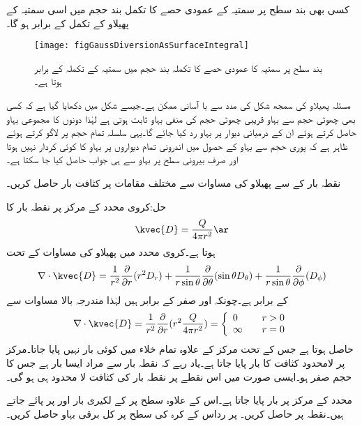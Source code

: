 کسی بھی بند سطح پر  سمتیہ کے عمودی حصے کا تکمل بند حجم میں اسی سمتیہ کے پھیلاو کے تکمل کے برابر ہو گا۔
\begin{figure}
\centering
\texttt{[image: figGaussDiversionAsSurfaceIntegral]}
\caption{بند سطح پر سمتیہ کا عمودی حصے کا تکملہ بند حجم میں سمتیہ کے تکملہ کے برابر ہوتا ہے۔}
\label{شکل_گاوس_پھیلاو_بطور_سطحی_تکلم}
\end{figure}

مسئلہ پھیلاو کی سمجھ شکل  کی مدد سے با آسانی ممکن ہے۔جیسے شکل میں دکھایا گیا ہے کہ کسی بھی چھوٹی حجم سے بہاو قریبی چھوٹی حجم  کی منفی بہاو ثابت ہوتی ہے لہٰذا دونوں کا مجموعی بہاو  حاصل کرتے ہوئے ان کے درمیانی دیوار  پر بہاو رد کیا جائے گا۔یہی سلسلہ تمام حجم پر لاگو کرتے ہوئے ظاہر ہے کہ پوری حجم سے بہاو کے حصول میں اندرونی تمام دیواروں پر بہاو کا کوئی کردار نہیں ہوتا اور صرف بیرونی سطح پر بہاو سے ہی جواب حاصل کیا جا سکتا ہے۔

نقطہ بار کے  سے پھیلاو کی مساوات سے مختلف مقامات پر کثافت بار  حاصل کریں۔

حل:کروی محدد کے مرکز پر نقطہ بار کا
\begin{align*}
\kvec{D}=\frac{Q}{4\pi r^2} \ar
\end{align*}
ہوتا ہے۔کروی محدد میں پھیلاو کی مساوات کے تحت
\begin{align*}
\nabla \cdot \kvec{D}=\frac{1}{r^2 }\frac{\partial }{\partial r} (r^2   D_{r})+\frac{1}{r \sin \theta }\frac{\partial }{\partial \theta} (\sin \theta  D_{\theta})+\frac{1}{r \sin \theta }\frac{\partial }{\partial \phi} (  D_{\phi}) 
\end{align*}
کے برابر ہے۔چونکہ  اور  صفر کے برابر ہیں لہٰذا مندرجہ بالا مساوات سے
\begin{align*}
\nabla \cdot \kvec{D}=\frac{1}{r^2 }\frac{\partial }{\partial r} (r^2 \frac{Q}{4\pi r^2}  )=\left\{
\begin{array}{l  l}
0 &\quad r> 0\\
\infty & \quad r=0
\end{array}
\right.
\end{align*}
حاصل ہوتا ہے جس کے تحت مرکز کے علاوہ تمام خلاء میں کوئی بار نہیں پایا جاتا۔مرکز پر لامحدود کثافت کا بار پایا جاتا ہے۔یاد رہے کہ نقطہ بار سے مراد ایسا بار ہے جس کا حجم صفر ہو۔ایسی صورت میں اس نقطے پر نقطہ بار کی کثافت لا محدود ہی ہو گی۔

\newpage
{}
محدد کے مرکز پر  بار پایا جاتا ہے۔اس کے علاوہ  سطح پر  کے لکیری بار  اور  پر پائے جاتے ہیں۔نقطہ  پر  حاصل کریں۔ پر رداس  کے کرہ کی سطح پر کل برقی بہاو  حاصل کریں۔ 


